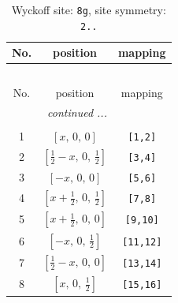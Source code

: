 \documentclass[fleqn,8pt]{jsarticle}
\begin{document}
\renewcommand{\arraystretch}{1.2}
\begin{longtable}{ccc}
\caption{Wyckoff site: {\tt 8g}, site symmetry: {\tt 2..}}
 \\
 \hline \hline
No. & position & mapping \\ \hline \endfirsthead

\multicolumn{2}{l}{\tablename\ \thetable{}} \\
 \hline \hline
No. & position & mapping \\ \hline \endhead

 \hline \hline
\multicolumn{2}{r}{\footnotesize\it continued ...} \\ \endfoot

 \hline \hline
\multicolumn{2}{r}{} \\ \endlastfoot

1 & $\left[ x,\, 0,\, 0 \right]$ & {\tt [1,2]} \\ \hline
2 & $\left[ \frac{1}{2} - x,\, 0,\, \frac{1}{2} \right]$ & {\tt [3,4]} \\ \hline
3 & $\left[ - x,\, 0,\, 0 \right]$ & {\tt [5,6]} \\ \hline
4 & $\left[ x + \frac{1}{2},\, 0,\, \frac{1}{2} \right]$ & {\tt [7,8]} \\ \hline
5 & $\left[ x + \frac{1}{2},\, 0,\, 0 \right]$ & {\tt [9,10]} \\ \hline
6 & $\left[ - x,\, 0,\, \frac{1}{2} \right]$ & {\tt [11,12]} \\ \hline
7 & $\left[ \frac{1}{2} - x,\, 0,\, 0 \right]$ & {\tt [13,14]} \\ \hline
8 & $\left[ x,\, 0,\, \frac{1}{2} \right]$ & {\tt [15,16]} \\
\end{longtable}
\renewcommand{\arraystretch}{1.2}
\end{document}
